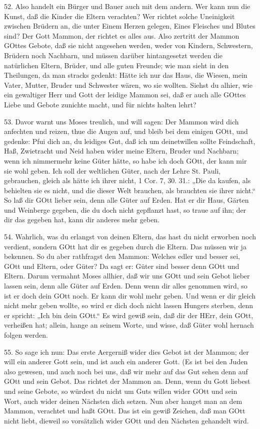 52. Also handelt ein Bürger und Bauer auch mit dem andern. Wer kann nun die Kunst, daß die Kinder die Eltern verachten? Wer richtet solche Uneinigkeit zwischen Brüdern an, die unter Einem Herzen gelegen, Eines Fleisches und Blutes sind? Der Gott Mammon, der richtet es alles aus. Also zertritt der Mammon GOttes Gebote, daß sie nicht angesehen werden, weder von Kindern, Schwestern, Brüdern noch Nachbarn, und müssen darüber hintangesetzt werden die natürlichen Eltern, Brüder, und alle guten Freunde; wie man sieht in den Theilungen, da man stracks gedenkt: Hätte ich nur das Haus, die Wiesen, mein Vater, Mutter, Bruder und Schwester wären, wo sie wollten. Siehst du alhier, wie ein gewaltiger Herr und Gott der leidige Mammon sei, daß er auch alle GOttes Liebe und Gebote zunichte macht, und für nichts halten lehrt?

53. Davor warnt uns Moses treulich, und will sagen: Der Mammon wird dich anfechten und reizen, thue die Augen auf, und bleib bei dem einigen GOtt, und gedenke: Pfui dich an, du leidiges Gut, daß ich um deinetwillen sollte Feindschaft, Haß, Zwietracht und Neid haben wider meine Eltern, Bruder und Nachbarn; wenn ich nimmermehr keine Güter hätte, so habe ich doch GOtt, der kann mir sie wohl geben. Ich soll der weltlichen Güter, nach der Lehre St. Pauli, gebrauchen, gleich als hätte ich ihrer nicht, 1 Cor. 7, 30. 31.: „Die da kaufen, als behielten sie es nicht, und die dieser Welt brauchen, als brauchten sie ihrer nicht.“ So laß dir GOtt lieber sein, denn alle Güter auf Erden. Hat er dir Haus, Gärten und Weinberge gegeben, die du doch nicht gepflanzt hast, so traue auf ihn; der dir das gegeben hat, kann dir anderes mehr geben.

54. Wahrlich, was du erlangst von deinen
Eltern, das hast du nicht erworben noch verdient, sondern GOtt hat dir es gegeben durch die Eltern. Das müssen wir ja bekennen. So du aber rathfragst den Mammon: Welches edler und besser sei, GOtt und Eltern, oder Güter? Da sagt er: Güter sind besser denn GOtt und Eltern. Darum vermahnt Moses allhier, daß wir uns GOtt und sein Gebot lieber lassen sein, denn alle Güter auf Erden. Denn wenn dir alles genommen wird, so ist er doch dein GOtt noch. Er kann dir wohl mehr geben. Und wenn er dir gleich nicht mehr geben wollte, so wird er dich doch nicht lassen Hungers sterben, denn er spricht: „Ich bin dein GOtt.“ Es wird gewiß sein, daß dir der HErr, dein GOtt, verheißen hat; allein, hange an seinem Worte, und wisse, daß Güter wohl hernach folgen werden.

55. So sage ich nun: Das erste Aergerniß wider dies Gebot ist der Mammon; der will ein anderer Gott sein, und ist auch ein anderer Gott. (Es ist bei den Juden also gewesen, und auch noch bei uns, daß wir mehr auf das Gut sehen denn auf GOtt und sein Gebot. Das richtet der Mammon an. Denn, wenn du Gott liebest und seine Gebote, so würdest du nicht um Guts willen wider GOtt und sein Wort, auch wider deinen Nächsten dich setzen. Nun aber hanget man an dem Mammon, verachtet und haßt GOtt. Das ist ein gewiß Zeichen, daß man GOtt nicht liebt, dieweil so vorsätzlich wider GOtt und den Nächsten gehandelt wird.

